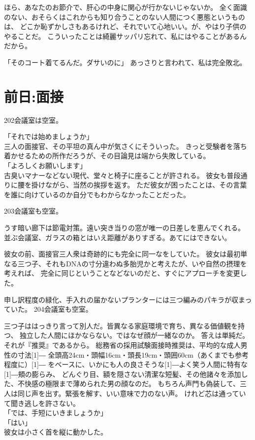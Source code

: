 \documentclass[../NenokuniMain]{subfiles}
\begin{document}
ほら、あなたのお節介で、肝心の中身に関心が行かないじゃないか。
全く面識のない、おそらくはこれからも知り合うことのない人間につく悪態というものは、
どこか恥ずかしさもあるけれど、それでいて心地いい。が、やはり子供のやることだ。
こういったことは綺麗サッパリ忘れて、私にはやることがあるんだから。

「そのコート着てるんだ。ダサいのに」
あっさりと言われて、私は完全敗北。\\

\section{前日:面接}
202会議室は空室。

「それでは始めましょうか」\\
三人の面接官、その平坦の真ん中が気さくにそういった。
きっと受験者を落ち着かせるための所作だろうが、その目論見は端から失敗している。\\
「よろしくお願いします」\\
古臭いマナーなどない現代、堂々と椅子に座ることが許される。
彼女も普段通りに腰を掛けながら、当然の挨拶を返す。
ただ彼女が困ったことは、その言葉を誰に向けているのか自分でもわからなかったことだった。

203会議室も空室。

うす暗い廊下は節電対策。遠い突き当りの窓が唯一の日差しを恵んでくれる。
並ぶ会議室、ガラスの箱とはいえ距離がありすぎる。あてにはできない。

彼女の前、面接官三人衆は奇跡的にも完全に同一なをしていた。
彼女は最初単なる三つ子、それもDNAの寸分違わぬ多胎児かと考えたが、いや自然の摂理を考えれば、
完全に同じということなどないのだと、すぐにアプローチを変更した。

申し訳程度の緑化、手入れの届かないプランターには三つ編みのパキラが収まっていた。
204会議室も空室。

三つ子ははっきり言って別人だ。皆異なる家庭環境で育ち、異なる価値観を持つ、
独立した人間にほかならない。ではなぜ顔が一緒なのか。
答えは単純だ。それが『推奨』であるから。
総務省の採用試験面接時推奨は、平均的な成人男性の寸法\scalebox{2}[1]{―}
全頭高24cm・頭幅16cm・頭長19cm・頭囲60cm（あくまでも参考程度に）\scalebox{2}[1]{―}
をベースに、いかにも人の良さそうな\scalebox{2}[1]{―}よく笑う人間に特有な\scalebox{2}[1]{―}頬の膨らみ、
どんぐり目、額を隠さない清潔な短髪、その他諸々を添加した、不快感の極限まで薄められた男の顔なのだ。
もちろん声門も偽装して、三人は同じ声を出す。緊張を解す、いい意味で力のない声。
けれど芯は通っていて聞き逃しを許さない。\\
「では、手短にいきましょうか」\\
「はい」\\
彼女は小さく首を縦に動かした。
\end{document}
